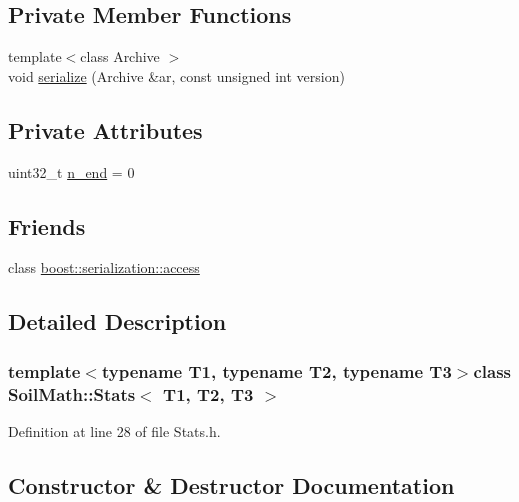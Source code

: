 \subsection*{Private Member Functions}
\begin{DoxyCompactItemize}
\item 
{\footnotesize template$<$class Archive $>$ }\\void \hyperlink{class_soil_math_1_1_stats_a708500880cf0fccd205fb59787f8899f}{serialize} (Archive \&ar, const unsigned int version)
\end{DoxyCompactItemize}
\subsection*{Private Attributes}
\begin{DoxyCompactItemize}
\item 
uint32\+\_\+t \hyperlink{class_soil_math_1_1_stats_a58553c8379f35dbc40f46ad228b5457e}{n\+\_\+end} = 0
\end{DoxyCompactItemize}
\subsection*{Friends}
\begin{DoxyCompactItemize}
\item 
class \hyperlink{class_soil_math_1_1_stats_ac98d07dd8f7b70e16ccb9a01abf56b9c}{boost\+::serialization\+::access}
\end{DoxyCompactItemize}


\subsection{Detailed Description}
\subsubsection*{template$<$typename T1, typename T2, typename T3$>$class Soil\+Math\+::\+Stats$<$ T1, T2, T3 $>$}



Definition at line 28 of file Stats.\+h.



\subsection{Constructor \& Destructor Documentation}
\hypertarget{class_soil_math_1_1_stats_aa9727b7ea39b46f8a010a7b710b26d83}{}
